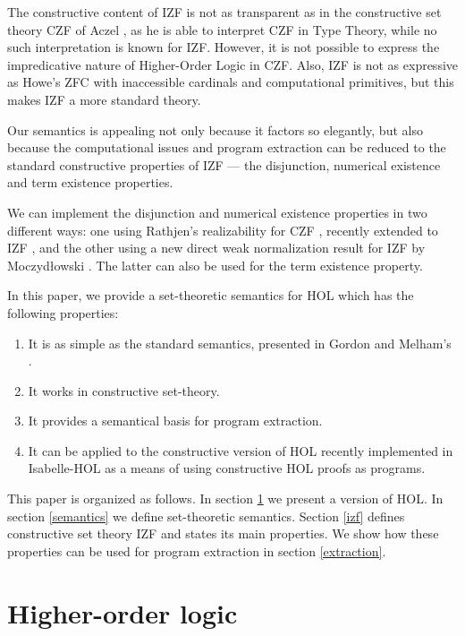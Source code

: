 \documentclass{LMCS}
\begin{document}
The constructive content of IZF is not as transparent as in the constructive
set theory CZF of Aczel \cite{Acz78}, as he is able to
interpret CZF in Type Theory, while no such interpretation is known for
IZF. However, it is not possible to express the impredicative nature of
Higher-Order Logic in CZF.  Also, IZF is not as expressive as Howe's ZFC
\cite{Howe96,Howe98a} with inaccessible cardinals and computational
primitives, but this makes IZF a more standard theory.

Our semantics is appealing not only because it factors so elegantly, but
also because the computational issues and program extraction can be reduced
to the standard constructive properties of IZF --- the disjunction,
numerical existence and term existence properties. 

We can implement the disjunction and numerical existence properties in two
different ways: one using Rathjen's realizability for CZF \cite{Rat05},
recently extended to IZF \cite{rathjen2006}, and the other using a new direct weak normalization result for IZF
by Moczyd\l owski \cite{jacsl2006,jatrinac2006}. The latter can also be used for the term existence
property.

In this paper, we provide a set-theoretic semantics for HOL which has the 
following properties: 
 
\begin{enumerate}[$\bullet$] 
\item It is as simple as the standard semantics, presented in Gordon and
Melham's \cite{GM93}.
\item It works in constructive set-theory. 
\item It provides a semantical basis for program extraction.
\item It can be applied to the constructive version of HOL recently
implemented in Isabelle-HOL as a means of using constructive HOL proofs
as programs.
\end{enumerate} 
 
This paper is organized as follows. In section \ref{hol} we present a
version of HOL. In section \ref{semantics} we define set-theoretic
semantics.  Section \ref{izf} defines constructive set theory IZF and states
its main properties. We show how these properties can be used for program
extraction in section \ref{extraction}. 
 
\section{Higher-order logic}\label{hol}
\end{document}
